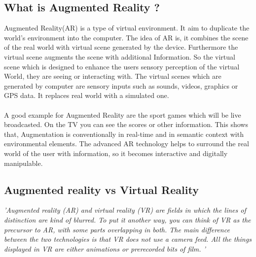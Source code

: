  \subsection{What is Augmented Reality ?}
  Augmented Reality(AR) is a type of  virtual environment. It aim to duplicate the world's environment into the computer. The idea of AR is, it combines the scene of the real world with virtual scene generated by the device. Furthermore the virtual scene augments the scene with additional Information. So the virtual scene which is designed to enhance the users sensory perception of the virtual World, they are seeing or interacting with. The virtual scenes which are generated by computer are sensory inputs such as sounds, videos, graphics or GPS data. It replaces real world with a simulated one.\cite{augmenteddef}
 \\\\
 A good example for Augmented Reality are the sport games which will be live broadcasted. On the TV you can see the scores or other information. This shows that,  Augmentation is conventionally in real-time and in semantic context with environmental elements. The advanced AR technology helps to surround the real world of the user with information, so it becomes interactive and digitally manipulable.\cite{augmenteddef}
 \\
 \subsection{Augmented reality vs Virtual Reality}
 
 \textit{'Augmented reality (AR) and virtual reality (VR) are fields in which the lines of
 distinction are kind of blurred. To put it another way, you can think of VR as the
 precursor to AR, with some parts overlapping in both. The main difference
 between the two technologies is that VR does not use a camera feed. All the
 things displayed in VR are either animations or prerecorded bits of film.
 '\cite{AugmentedBook}}
